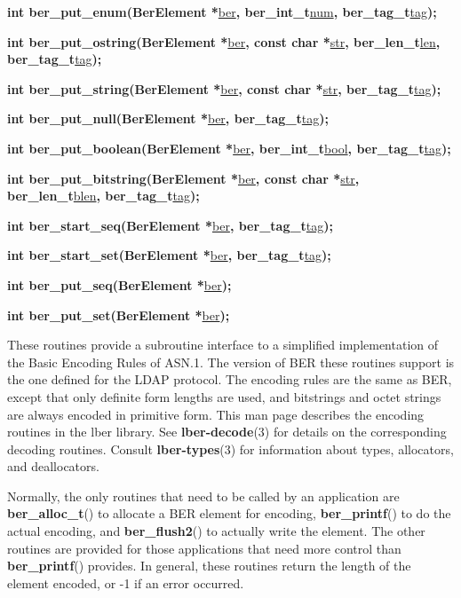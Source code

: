 \documentclass[]{article}
\let\realtextbf=\textbf
\renewcommand{\textbf}[1]{\textcolor{boldcolor}{\realtextbf{#1}}}
\renewcommand{\emph}[1]{\underline{#1}}
\begin{document}
\textbf{int ber\_put\_enum(BerElement *}\emph{ber}\textbf{,
ber\_int\_t}\emph{num}\textbf{, ber\_tag\_t}\emph{tag}\textbf{);}

\textbf{int ber\_put\_ostring(BerElement *}\emph{ber}\textbf{, const
char *}\emph{str}\textbf{, ber\_len\_t}\emph{len}\textbf{,
ber\_tag\_t}\emph{tag}\textbf{);}

\textbf{int ber\_put\_string(BerElement *}\emph{ber}\textbf{, const char
*}\emph{str}\textbf{, ber\_tag\_t}\emph{tag}\textbf{);}

\textbf{int ber\_put\_null(BerElement *}\emph{ber}\textbf{,
ber\_tag\_t}\emph{tag}\textbf{);}

\textbf{int ber\_put\_boolean(BerElement *}\emph{ber}\textbf{,
ber\_int\_t}\emph{bool}\textbf{, ber\_tag\_t}\emph{tag}\textbf{);}

\textbf{int ber\_put\_bitstring(BerElement *}\emph{ber}\textbf{, const
char *}\emph{str}\textbf{, ber\_len\_t}\emph{blen}\textbf{,
ber\_tag\_t}\emph{tag}\textbf{);}

\textbf{int ber\_start\_seq(BerElement *}\emph{ber}\textbf{,
ber\_tag\_t}\emph{tag}\textbf{);}

\textbf{int ber\_start\_set(BerElement *}\emph{ber}\textbf{,
ber\_tag\_t}\emph{tag}\textbf{);}

\textbf{int ber\_put\_seq(BerElement *}\emph{ber}\textbf{);}

\textbf{int ber\_put\_set(BerElement *}\emph{ber}\textbf{);}


These routines provide a subroutine interface to a simplified
implementation of the Basic Encoding Rules of ASN.1. The version of BER
these routines support is the one defined for the LDAP protocol. The
encoding rules are the same as BER, except that only definite form
lengths are used, and bitstrings and octet strings are always encoded in
primitive form. This man page describes the encoding routines in the
lber library. See \textbf{lber-decode}(3) for details on the
corresponding decoding routines. Consult \textbf{lber-types}(3) for
information about types, allocators, and deallocators.

Normally, the only routines that need to be called by an application are
\textbf{ber\_alloc\_t}() to allocate a BER element for encoding,
\textbf{ber\_printf}() to do the actual encoding, and
\textbf{ber\_flush2}() to actually write the element. The other routines
are provided for those applications that need more control than
\textbf{ber\_printf}() provides. In general, these routines return the
length of the element encoded, or -1 if an error occurred.
\end{document}
